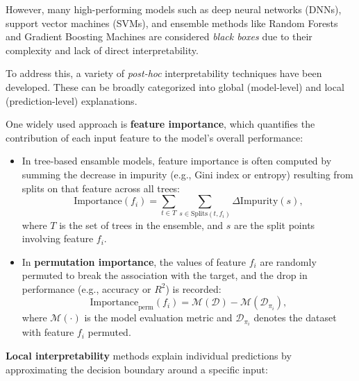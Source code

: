 However, many high-performing models such as deep neural networks (DNNs),
support vector machines (SVMs), and ensemble methods like Random Forests and
Gradient Boosting Machines are considered \emph{black boxes} due to their
complexity and lack of direct interpretability.

To address this, a variety of \emph{post-hoc} interpretability techniques have
been developed. These can be broadly categorized into global (model-level) and
local (prediction-level) explanations.

One widely used approach is \textbf{feature importance}, which quantifies the
contribution of each input feature to the model's overall performance:

\begin{itemize}
    \item In tree-based ensamble models, feature importance is often computed by summing
          the decrease in impurity (e.g., Gini index or entropy) resulting from splits on
          that feature across all trees: \begin{equation} \text{Importance}(f_i) =
              \sum_{t \in T} \sum_{s \in \text{Splits}(t, f_i)} \Delta \text{Impurity}(s),
          \end{equation}
          where $T$ is the set of trees in the ensemble, and $s$ are the split points
          involving feature $f_i$.

    \item In \textbf{permutation importance}, the values of feature $f_i$ are randomly
          permuted to break the association with the target, and the drop in performance
          (e.g., accuracy or $R^2$) is recorded:
          \begin{equation} \text{Importance}_{\text{perm}}(f_i) =
              \mathcal{M}(\mathcal{D}) - \mathcal{M}(\mathcal{D}_{\pi_i}),
          \end{equation}
          where $\mathcal{M}(\cdot)$ is the model evaluation metric and
          $\mathcal{D}_{\pi_i}$ denotes the dataset with feature $f_i$ permuted.
\end{itemize}

\textbf{Local interpretability} methods explain individual predictions by approximating
the decision boundary around a specific input:

